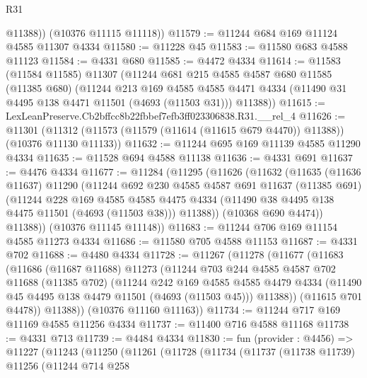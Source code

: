 \begin{lexlean}{R31}
\begin{coremodule}
          @11388))
      (@10376 @11115 @11118))
@11579 := @11244 @684 @169 @11124 @4585 @11307 @4334
@11580 := @11228 @45
@11583 := @11580 @683 @4588 @11123
@11584 := @4331 @680
@11585 := @4472 @4334
@11614 := @11583
    (@11584 @11585)
    @11307
    (@11244
      @681
      @215
      @4585
      @4587
      @680
      @11585
      (@11385 @680)
      (@11244
        @213
        @169
        @4585
        @4585
        @4471
        @4334
        (@11490 @31 @4495 @138 @4471 @11501 (@4693 (@11503 @31)))
        @11388))
@11615 := LexLeanPreserve.Cb2bffcc8b22fbbef7efb3ff023306838.R31.__rel_4
@11626 := @11301
    (@11312 (@11573 (@11579 (@11614 (@11615 @679 @4470)) @11388)) (@10376 @11130 @11133))
@11632 := @11244 @695 @169 @11139 @4585 @11290 @4334
@11635 := @11528 @694 @4588 @11138
@11636 := @4331 @691
@11637 := @4476 @4334
@11677 := @11284
    (@11295
      (@11626
        (@11632
          (@11635
            (@11636 @11637)
            @11290
            (@11244
              @692
              @230
              @4585
              @4587
              @691
              @11637
              (@11385 @691)
              (@11244
                @228
                @169
                @4585
                @4585
                @4475
                @4334
                (@11490 @38 @4495 @138 @4475 @11501 (@4693 (@11503 @38)))
                @11388))
            (@10368 @690 @4474))
          @11388))
      (@10376 @11145 @11148))
@11683 := @11244 @706 @169 @11154 @4585 @11273 @4334
@11686 := @11580 @705 @4588 @11153
@11687 := @4331 @702
@11688 := @4480 @4334
@11728 := @11267
    (@11278
      (@11677
        (@11683
          (@11686
            (@11687 @11688)
            @11273
            (@11244
              @703
              @244
              @4585
              @4587
              @702
              @11688
              (@11385 @702)
              (@11244
                @242
                @169
                @4585
                @4585
                @4479
                @4334
                (@11490 @45 @4495 @138 @4479 @11501 (@4693 (@11503 @45)))
                @11388))
            (@11615 @701 @4478))
          @11388))
      (@10376 @11160 @11163))
@11734 := @11244 @717 @169 @11169 @4585 @11256 @4334
@11737 := @11400 @716 @4588 @11168
@11738 := @4331 @713
@11739 := @4484 @4334
@11830 := fun (provider : @4456) =>
  @11227
    (@11243
      (@11250
        (@11261
          (@11728
            (@11734
              (@11737
                (@11738 @11739)
                @11256
                (@11244
                  @714
                  @258

\end{coremodule}
\end{lexlean}

